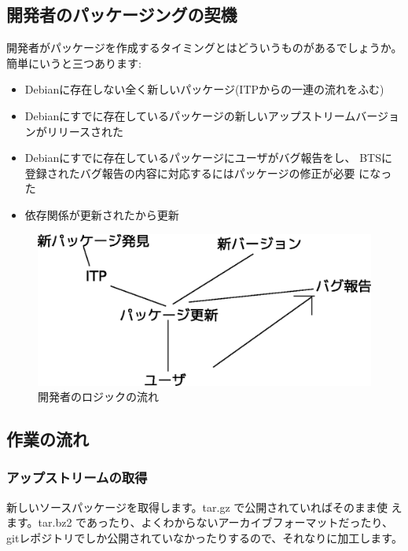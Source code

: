 \documentclass[mingoth,a4paper]{jsarticle}
\begin{document}
 \subsection{開発者のパッケージングの契機}

開発者がパッケージを作成するタイミングとはどういうものがあるでしょうか。
簡単にいうと三つあります:

 \begin{itemize}
 \item Debianに存在しない全く新しいパッケージ(ITPからの一連の流れをふむ)
 \item Debianにすでに存在しているパッケージの新しいアップストリームバージョンがリリースされた
 \item Debianにすでに存在しているパッケージにユーザがバグ報告をし、
       BTSに登録されたバグ報告の内容に対応するにはパッケージの修正が必要
       になった
  \item 依存関係が更新されたから更新
 \end{itemize}

\begin{figure}[h]
 \begin{center}
  \includegraphics[width=0.8\hsize]{image200801/devel-logic-i.eps}
 \end{center} 
 \caption{開発者のロジックの流れ}
\end{figure}

 \subsection{作業の流れ}
 \subsubsection{アップストリームの取得}

新しいソースパッケージを取得します。tar.gz で公開されていればそのまま使
えます。tar.bz2 であったり、よくわからないアーカイブフォーマットだったり、
gitレポジトリでしか公開されていなかったりするので、それなりに加工します。
\end{document}
